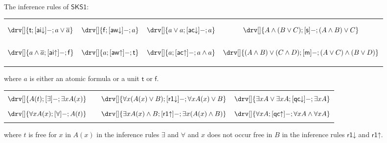 \documentclass[10pt]{article}
\theoremstyle{definition}\newtheorem{remark}[theorem]{Remark}
\theoremstyle{definition}\newtheorem{example}[theorem]{Example}
\theoremstyle{definition}\newtheorem{definition}[theorem]{Definition}
\newcommand{\SKSqDecomp}{{\mathsf{SKS1}}}
\newcommand{\aiUp}{{\mathsf{ai\mathord\uparrow}}}
\newcommand{\aiDown}{{\mathsf{ai\mathord\downarrow}}}
\newcommand{\acUp}{{\mathsf{ac\mathord\uparrow}}}
\newcommand{\acDown}{{\mathsf{ac\mathord\downarrow}}}
\newcommand{\awUp}{{\mathsf{aw\mathord\uparrow}}}
\newcommand{\awDown}{{\mathsf{aw\mathord\downarrow}}}
\newcommand{\switch}{{\mathsf{s}}}
\newcommand{\medial}{{\mathsf{m}}}
\newcommand{\qcUp}{{\mathsf{qc\mathord\uparrow}}}
\newcommand{\qcDown}{{\mathsf{qc\mathord\downarrow}}}
\newcommand{\rOneUp}{{\mathsf{r1\mathord\uparrow}}}
\newcommand{\rOneDown}{{\mathsf{r1\mathord\downarrow}}}
\newcommand{\trueUnit}{\mathsf{t}}
\newcommand{\falseUnit}{\mathsf{f}}
\begin{document}
	\begin{figure}
		{\centering
			The inference rules of $\SKSqDecomp$:\vspace{0.5em}
			
			\begin{tabular} { | c c c c | }
				\hline
				& & & \\
				$$\drv[] {\trueUnit ; [\aiDown]- ; a \lor \overline{a}}$$ & $$\drv[] {\falseUnit ; [\awDown]- ; a}$$ & $$\drv[] {a \lor a ; [\acDown]- ; a}$$ & $$\drv[] {A \land (B \lor C) ; [\switch]- ; (A \land B) \lor C}$$  \\
				& & & \\
				$$\drv[] {a \land \overline{a} ; [\aiUp]- ; \falseUnit}$$ & $$\drv[] {a ; [\awUp]- ; \trueUnit}$$ & $$\drv[] {a ; [\acUp]- ; a \land a}$$ & $$\drv[] {(A \land B) \lor (C \land D) ; [\medial]- ; (A \lor C) \land (B \lor D)}$$ \\
				& & & \\
				\hline
			\end{tabular}
			\par}
		
		\vspace{0.5em} where $a$ is either an atomic formula or a unit $\trueUnit$ or $\falseUnit$.\vspace{1em}
		
		{\centering
			
			\begin{tabular} { | c c c | }
				\hline
				& & \\
				$\drv[] {A(t) ; [\exists]- ; \exists x A(x)}$ &
				$\hspace{1em}\drv[] {\forall x (A(x) \lor B) ; [\rOneDown]- ; \forall x A(x) \lor B}$ &
				$\drv[] {\exists x A \lor \exists x A ; [\qcDown]- ; \exists x A}$ \\
				& & \\
				$\drv[] {\forall x A(x) ; [\forall]- ; A(t)}$ &
				$\hspace{1em}\drv[] {\exists x A(x) \land B ; [\rOneUp]- ; \exists x (A(x) \land B)}$ &
				$\drv[] {\forall x A ; [\qcUp]- ; \forall x A \land \forall x A}$ \\
				& &  \\
				\hline
			\end{tabular}
			\par}
		
		\vspace{0.5em}where $t$ is free for $x$ in $A(x)$ in the inference rules $\exists$ and $\forall$ and $x$ does not occur free in $B$ in the inference rules $\rOneDown$ and $\rOneUp$.
		

\end{figure}
\end{document}
